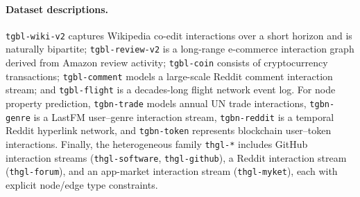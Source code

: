 \paragraph{Dataset descriptions.}
\texttt{tgbl-wiki-v2} captures Wikipedia co-edit interactions over a short horizon and is naturally bipartite; \texttt{tgbl-review-v2} is a long-range e-commerce interaction graph derived from Amazon review activity; \texttt{tgbl-coin} consists of cryptocurrency transactions; \texttt{tgbl-comment} models a large-scale Reddit comment interaction stream; and \texttt{tgbl-flight} is a decades-long flight network event log.
For node property prediction, \texttt{tgbn-trade} models annual UN trade interactions, \texttt{tgbn-genre} is a LastFM user--genre interaction stream, \texttt{tgbn-reddit} is a temporal Reddit hyperlink network, and \texttt{tgbn-token} represents blockchain user--token interactions.
Finally, the heterogeneous family \texttt{thgl-*} includes GitHub interaction streams (\texttt{thgl-software}, \texttt{thgl-github}), a Reddit interaction stream (\texttt{thgl-forum}), and an app-market interaction stream (\texttt{thgl-myket}), each with explicit node/edge type constraints.


